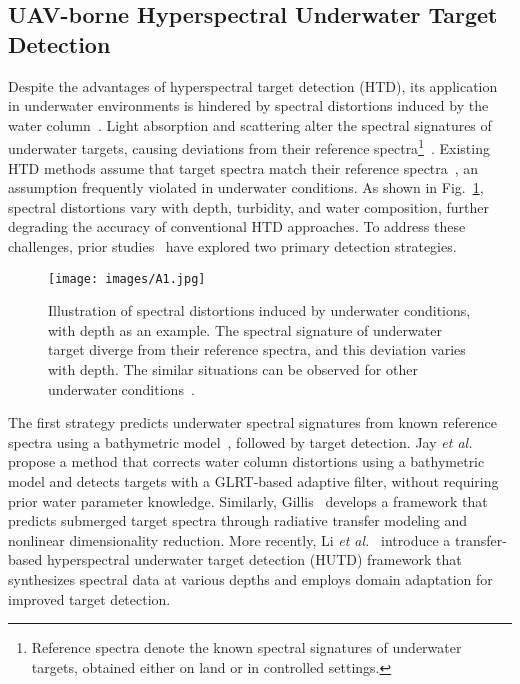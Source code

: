 \subsection{UAV-borne Hyperspectral Underwater Target Detection}
Despite the advantages of hyperspectral target detection (HTD), its application in underwater environments is hindered by spectral distortions induced by the water column~\cite{Gillis2020}.  
Light absorption and scattering alter the spectral signatures of underwater targets, causing deviations from their reference spectra\footnote{
    Reference spectra denote the known spectral signatures of underwater targets, obtained either on land or in controlled settings.
}~\cite{Gillis2020}.  
Existing HTD methods assume that target spectra match their reference spectra~\cite{Manolakis2014}, an assumption frequently violated in underwater conditions.  
As shown in Fig.~\ref{fig:A1-2}, spectral distortions vary with depth, turbidity, and water composition, further degrading the accuracy of conventional HTD approaches.  
To address these challenges, prior studies~\cite{Liu2024,Gillis2020,Jay2012,LiZheyong2023,Qi2021} have explored two primary detection strategies.  
\par
\begin{figure}[!t]                  
    \centering                    
    \texttt{[image: images/A1.jpg]}                     
    \caption{Illustration of spectral distortions induced by underwater conditions, with depth as an example. 
    The spectral signature of underwater target diverge from their reference spectra, and this deviation varies with depth.
    The similar situations can be observed for other underwater conditions~\cite{Gillis2020}.}           
    \label{fig:A1-2}    
\end{figure}
The first strategy predicts underwater spectral signatures from known reference spectra using a bathymetric model~\cite{Lee1998}, followed by target detection.  
Jay \emph{et al.}~\cite{Jay2012} propose a method that corrects water column distortions using a bathymetric model and detects targets with a GLRT-based adaptive filter, without requiring prior water parameter knowledge.  
Similarly, Gillis~\cite{Gillis2020} develops a framework that predicts submerged target spectra through radiative transfer modeling and nonlinear dimensionality reduction.  
More recently, Li \emph{et al.}~\cite{LiZheyong2023} introduce a transfer-based hyperspectral underwater target detection (HUTD) framework that synthesizes spectral data at various depths and employs domain adaptation for improved target detection.  

